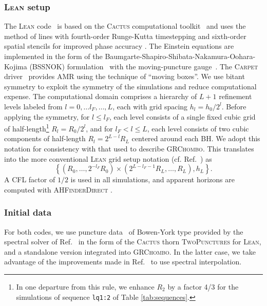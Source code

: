 \documentclass[floats,floatfix,showpacs,amssymb,prd,twocolumn,superscriptaddress,nofootinbib,nolongbibliography,reprint]{revtex4-2}
\newcommand{\mr}[1]{{\textcolor{cyan}{\sf{[MR: #1]}} }}
\newcommand{\us}[1]{{\textcolor{teal}{\sf{[US: #1]}} }}
\begin{document}
\subsubsection{\textsc{Lean} setup}
\label{sec:lean}
The \textsc{Lean} code~\cite{Sperhake:2006cy} is based on the 
\textsc{Cactus} computational toolkit~\cite{Goodale2002a} and uses 
the method of lines with fourth-order Runge-Kutta timestepping and 
sixth-order spatial stencils for improved phase accuracy 
\cite{Husa:2007hp}. The Einstein equations are implemented in the form 
of the Baumgarte-Shapiro-Shibata-Nakamura-Oohara-Kojima (BSSNOK) 
formulation~\cite{Nakamura:1987zz,Shibata:1995we,Baumgarte:1998te} 
with the moving-puncture gauge~\cite{Campanelli:2005dd,Baker:2005vv}. 
The \textsc{Carpet} driver~\cite{Schnetter:2003rb} provides AMR using 
the technique of ``moving boxes''. We use bitant symmetry to exploit 
the symmetry of the simulations and reduce computational expense. 
The computational domain 
comprises a hierarchy of $L+1$ refinement levels labeled from 
$l=0,\ldots l_F,\ldots,L$, each with grid spacing $h_l=h_0/2^l$. 
Before applying the symmetry, for $l\leq l_F$, each level consists of 
a single fixed cubic grid of half-length\footnote{In one departure from
this rule, we enhance $R_2$ by a factor 4/3 for the simulations
of sequence \texttt{lq1:2} of Table \ref{tab:sequences}.}
$R_l=R_0/2^l$, and for 
$l_F<l\leq L$, each level consists of two cubic components of 
half-length $R_l=2^{L-l}R_L$ centered around each BH. We adopt this 
notation for consistency with that used to describe \textsc{GRChombo}. 
This translates into the more conventional \textsc{Lean} grid setup 
notation (cf. Ref.~\cite{Sperhake:2006cy}) as
\begin{equation}
    \left\{(R_0,\ldots,2^{-l_F}R_0) \times 
    (2^{L-l_F-1}R_L,\ldots,R_L),h_L\right\}.
\end{equation}
A CFL factor of $1/2$ is used in all simulations, and apparent horizons 
are computed with \textsc{AHFinderDirect}
\cite{Thornburg:1995cp,Thornburg:2003sf}.

\subsubsection{Initial data}
For both codes, we use puncture data~\cite{Brandt:1997tf} of
Bowen-York \cite{Bowen:1980yu} type provided by the spectral solver of
Ref.~\cite{Ansorg:2004ds} in the form of the \textsc{Cactus} thorn
\textsc{TwoPunctures} for \textsc{Lean}, and a standalone version
integrated into \textsc{GRChombo}.  In the latter case, we take
advantage of the improvements made in Ref.~\cite{Paschalidis:2013oya}
to use spectral interpolation.
\end{document}
